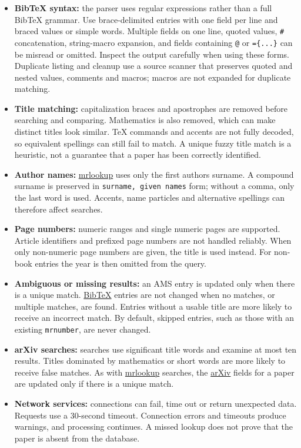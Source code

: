 \documentclass{amsart}
\providecommand{\tightlist}{\setlength{\itemsep}{0pt}\setlength{\parskip}{0pt}}
\begin{document}
\begin{itemize}
\tightlist
\item
  \textbf{BibTeX syntax:} the parser uses regular expressions rather
  than a full BibTeX grammar. Use brace-delimited entries with one field
  per line and braced values or simple words. Multiple fields on one
  line, quoted values, \texttt{\#} concatenation, string-macro
  expansion, and fields containing \texttt{@} or \texttt{=\{...\}} can
  be misread or omitted. Inspect the output carefully when using these
  forms. Duplicate listing and cleanup use a source scanner that
  preserves quoted and nested values, comments and macros; macros are
  not expanded for duplicate matching.
\item
  \textbf{Title matching:} capitalization braces and apostrophes are
  removed before searching and comparing. Mathematics is also removed,
  which can make distinct titles look similar. TeX commands and accents
  are not fully decoded, so equivalent spellings can still fail to
  match. A unique fuzzy title match is a heuristic, not a guarantee that
  a paper has been correctly identified.
\item
  \textbf{Author names:}
  \href{https://mathscinet.ams.org/mathscinet/freetools/mrlookup}{mrlookup}
  uses only the first author\textquotesingle s surname. A compound
  surname is preserved in \texttt{surname,\ given\ names} form; without
  a comma, only the last word is used. Accents, name particles and
  alternative spellings can therefore affect searches.
\item
  \textbf{Page numbers:} numeric ranges and single numeric pages are
  supported. Article identifiers and prefixed page numbers are not
  handled reliably. When only non-numeric page numbers are given, the
  title is used instead. For non-book entries the year is then omitted
  from the query.
\item
  \textbf{Ambiguous or missing results:} an AMS entry is updated only
  when there is a unique match. \href{http://www.bibtex.org/}{BibTeX}
  entries are not changed when no matches, or multiple matches, are
  found. Entries without a usable title are more likely to receive an
  incorrect match. By default, skipped entries, such as those with an
  existing \texttt{mrnumber}, are never changed.
\item
  \textbf{arXiv searches:} searches use significant title words and
  examine at most ten results. Titles dominated by mathematics or short
  words are more likely to receive false matches. As with
  \href{https://mathscinet.ams.org/mathscinet/freetools/mrlookup}{mrlookup}
  searches, the \href{http://arxiv.org/}{arXiv} fields for a paper are
  updated only if there is a unique match.
\item
  \textbf{Network services:} connections can fail, time out or return
  unexpected data. Requests use a 30-second timeout. Connection errors
  and timeouts produce warnings, and processing continues. A missed
  lookup does not prove that the paper is absent from the database.
\end{itemize}
\end{document}
